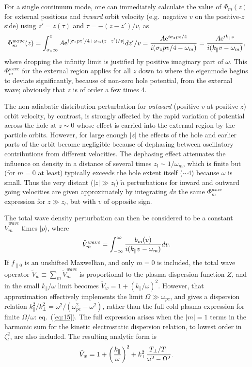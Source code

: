 \documentclass[12pt]{article}
\def\ket#1{|#1\rangle}
\begin{document}
For a single continuum mode, one can immediately calculate the value
of $\Phi_m(z)$ for external positions and \emph{inward} orbit velocity
(e.g.\ negative $v$ on the positive-$z$ side) using $z'=z(\tau)$ and
$\tau=-(z-z')/v$, as
\begin{equation}
  \label{Phiwave}
  \Phi_{m}^{wave}(z) = \int_{\sigma_z\infty}^zA{\rm e}^{i[\sigma_zpz'/4+\omega_m
    (z-z')/v]}dz'/v
  ={A{\rm e}^{i\sigma_zpz/4} \over i(\sigma_zpv/4-\omega_m)}={A{\rm e}^{ik_\parallel z} \over
    i(k_\parallel v-\omega_m)},
\end{equation}
where dropping the infinity limit is justified by positive imaginary
part of $\omega$.  This $\Phi_{m}^{wave}$ for the external 
region applies for all $z$ down to where the eigenmode begins to
deviate significantly, because of non-zero hole potential, from the
external wave; obviously that $z$ is of order a few times 4.

The non-adiabatic distribution perturbation for \emph{outward}
(positive $v$ at positive $z$) orbit velocity, by contrast, is
strongly affected by the rapid variation of potential across the hole
at $z\sim 0$ whose effect is carried into the external region by the
particle orbits. However, for large enough $|z|$ the effects of the
hole and earlier parts of the orbit become negligible because of
dephasing between oscillatory contributions from different
velocities. The dephasing effect attenuates the influence on density
in a distance of several times $z_l\sim 1/\omega_m$, which is finite
but (for $m=0$ at least) typically exceeds the hole extent itself
($\sim 4$) because $\omega$ is small.  Thus the very distant
($|z|\gg z_l$) $\tilde n$ perturbations for inward and outward going
velocities are given approximately by integrating $dv$ the same
$\Phi_m^{wave}$ expression for $z\gg z_l$, but with $v$ of opposite
sign.

The total wave density perturbation can then be considered to be a
constant $\tilde V_m^{wave}$ times $\ket{p}$, where
\begin{equation}
  \label{vmwave}
  \tilde V_m^{wave}= \int_{-\infty}^\infty { b_m(v) \over
    i(k_\parallel v-\omega_m)} dv.
\end{equation}
If $f_{\parallel0}$ is an unshifted Maxwellian, and only $m=0$ is
included, the total wave operator
$\tilde V_w\equiv \sum_m\tilde V_m^{wave}$ is proportional to the
plasma dispersion function $Z$, and in the small $k_\parallel/\omega$
limit becomes $\tilde V_w=1+(k_\parallel/\omega)^2$.  However, that
approximation effectively implements the limit
$\Omega\gg \omega_{pe}$, and gives a dispersion relation
$k_\parallel^2/k_\perp^2 = \omega^2/(\omega_{pe}^2-\omega^2)$, rather
than the full cold plasma expression for finite $\Omega/\omega$: eq.\
(\ref{eq:15}). The full expression arises when the $|m|=1$ terms in
the harmonic sum for the kinetic electrostatic dispersion
relation\cite[see, e.g.][section 4.4.]{Swanson1989}, to lowest
order in $\zeta_t^2$, are also included. The resulting analytic form
is
\begin{equation}
  \label{eq:24}
  \tilde V_w= 1 + \left(k_\parallel\over\omega\right)^2 +
  k_\perp^2 {T_\perp/T_\parallel\over\omega^2-\Omega^2}.
\end{equation}
\end{document}
